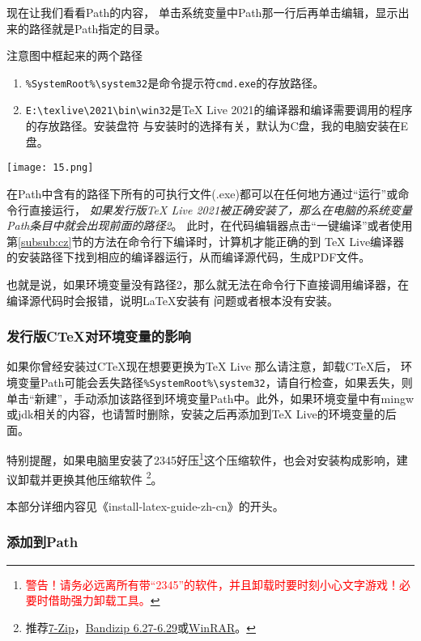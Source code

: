 现在让我们看看Path的内容， 单击系统变量中Path那一行后再单击编辑，显示出来的路径就是Path指定的目录。

注意图中框起来的两个路径
\begin{enumerate}
  \item \verb"%SystemRoot%\system32"是命令提示符\verb"cmd.exe"的存放路径。
  \item \verb"E:\texlive\2021\bin\win32"是\TeX{} Live 2021的编译器和编译需要调用的程序的存放路径。安装盘符
        与安装时的选择有关，默认为C盘，我的电脑安装在E盘。
\end{enumerate}
\begin{center}
  \texttt{[image: 15.png]}
\end{center}

在Path中含有的路径下所有的可执行文件(.exe)都可以在任何地方通过“运行”或命令行直接运行，
\emph{如果发行版\TeX{} Live 2021被正确安装了，那么在电脑的系统变量Path条目中就会出现前面的路径2}。
此时，在代码编辑器点击“一键编译”或者使用第\ref{subsub:cz}节的方法在命令行下编译时，计算机才能正确的到
\TeX{} Live编译器的安装路径下找到相应的编译器运行，从而编译源代码，生成PDF文件。

也就是说，如果环境变量没有路径2，那么就无法在命令行下直接调用编译器，在编译源代码时会报错，说明\LaTeX{}安装有
问题或者根本没有安装。



\subsubsection{发行版C\TeX{}对环境变量的影响}


如果你曾经安装过C\TeX{}现在想要更换为\TeX{} Live 那么请注意，卸载C\TeX{}后，
环境变量Path可能会丢失路径\verb"%SystemRoot%\system32"，请自行检查，如果丢失，则
单击“新建”，手动添加该路径到环境变量Path中。此外，如果环境变量中有mingw或jdk相关的内容，也请暂时删除，安装之后再添加到\TeX{} Live的环境变量的后面。

特别提醒，如果电脑里安装了2345好压\footnote{\textcolor{red}{警告！请务必远离所有带“2345”的软件，并且卸载时要时刻小心文字游戏！必要时借助强力卸载工具。}}这个压缩软件，也会对安装构成影响，建议卸载并更换其他压缩软件
\footnote{推荐\href{https://sourceforge.net/projects/sevenzip/}{7-Zip}，\href{https://www.bandisoft.com/bandizip/}{Bandizip 6.27-6.29}或\href{http://www.winrar.com.cn/}{WinRAR}。}。

本部分详细内容见《install-latex-guide-zh-cn》的开头。



\subsubsection{添加到Path}


